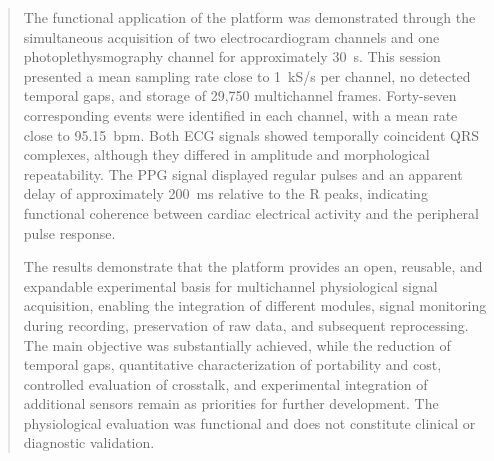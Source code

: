 \documentclass[a4paper,12pt]{fcte}
\begin{document}
\begin{abstract}
The functional application of the platform was demonstrated through the simultaneous acquisition of two electrocardiogram channels and one photoplethysmography channel for approximately 30~s. This session presented a mean sampling rate close to 1~kS/s per channel, no detected temporal gaps, and storage of 29,750 multichannel frames. Forty-seven corresponding events were identified in each channel, with a mean rate close to 95.15~bpm. Both ECG signals showed temporally coincident QRS complexes, although they differed in amplitude and morphological repeatability. The PPG signal displayed regular pulses and an apparent delay of approximately 200~ms relative to the R peaks, indicating functional coherence between cardiac electrical activity and the peripheral pulse response.

The results demonstrate that the platform provides an open, reusable, and expandable experimental basis for multichannel physiological signal acquisition, enabling the integration of different modules, signal monitoring during recording, preservation of raw data, and subsequent reprocessing. The main objective was substantially achieved, while the reduction of temporal gaps, quantitative characterization of portability and cost, controlled evaluation of crosstalk, and experimental integration of additional sensors remain as priorities for further development. The physiological evaluation was functional and does not constitute clinical or diagnostic validation.

\end{abstract}

\indice

\begin{simbolos}
\end{simbolos}
\end{document}
